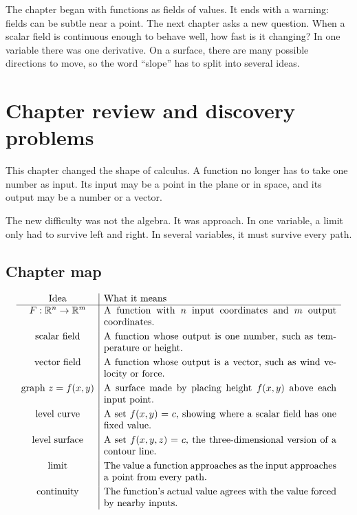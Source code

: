 The chapter began with functions as fields of values.  It ends with a warning: fields can
be subtle near a point.  The next chapter asks a new question.  When a scalar field is
continuous enough to behave well, how fast is it changing?  In one variable there was
one derivative.  On a surface, there are many possible directions to move, so the word
``slope'' has to split into several ideas.

\section{Chapter review and discovery problems}
\label{sec:6.6}

This chapter changed the shape of calculus.  A function no longer has to take one
number as input.  Its input may be a point in the plane or in space, and its output may
be a number or a vector.

The new difficulty was not the algebra.  It was approach.  In one variable, a limit only
had to survive left and right.  In several variables, it must survive every path.

\subsection*{Chapter map}

\[
\begin{array}{c|p{8.5cm}}
\text{Idea} & \text{What it means} \\ \hline
F:\mathbb R^n\to\mathbb R^m
&
A function with \(n\) input coordinates and \(m\) output coordinates.\\[1mm]
\text{scalar field}
&
A function whose output is one number, such as temperature or height.\\[1mm]
\text{vector field}
&
A function whose output is a vector, such as wind velocity or force.\\[1mm]
\text{graph } z=f(x,y)
&
A surface made by placing height \(f(x,y)\) above each input point.\\[1mm]
\text{level curve}
&
A set \(f(x,y)=c\), showing where a scalar field has one fixed value.\\[1mm]
\text{level surface}
&
A set \(f(x,y,z)=c\), the three-dimensional version of a contour line.\\[1mm]
\text{limit}
&
The value a function approaches as the input approaches a point from every path.\\[1mm]
\text{continuity}
&
The function's actual value agrees with the value forced by nearby inputs.
\end{array}
\]

